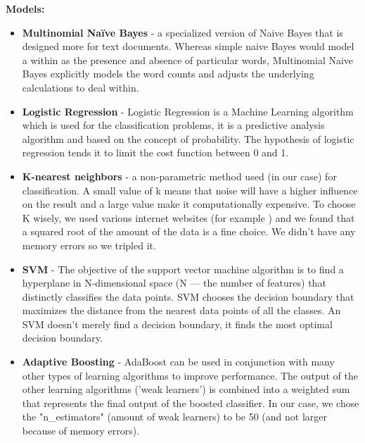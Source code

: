 \documentclass[11pt,a4paper]{article}
\begin{document}
\textbf{Models:}\\
\begin{itemize}
\item \textbf{Multinomial Naïve Bayes} - a specialized version of Naive Bayes that is designed more for text documents. Whereas simple naive Bayes would model a within as the presence and absence of particular words, Multinomial Naive Bayes explicitly models the word counts and adjusts the underlying calculations to deal within.
\item \textbf{Logistic Regression} - Logistic Regression is a Machine Learning algorithm which is used for the classification problems, it is a predictive analysis algorithm and based on the concept of probability. The hypothesis of logistic regression tends it to limit the cost function between 0 and 1.
\item \textbf{K-nearest neighbors} - a non-parametric method used (in our case) for classification. A small value of k means that noise will have a higher influence on the result and a large value make it computationally expensive. To choose K wisely, we used various internet websites (for example \citep{lnk3}) and we found that a squared root of the amount of the data is a fine choice. We didn't have any memory errors so we tripled it.
\item \textbf{SVM} - The objective of the support vector machine algorithm is to find a hyperplane in N-dimensional space (N — the number of features) that distinctly classifies the data points. SVM chooses the decision boundary that maximizes the distance from the nearest data points of all the classes. An SVM doesn't merely find a decision boundary, it finds the most optimal decision boundary.
\item \textbf{Adaptive Boosting} - AdaBoost can be used in conjunction with many other types of learning algorithms to improve performance. The output of the other learning algorithms ('weak learners') is combined into a weighted sum that represents the final output of the boosted classifier. In our case, we chose the "n\_estimators" (amount of weak learners) to be 50 (and not larger because of memory errors).
\end{itemize}
\end{document}
